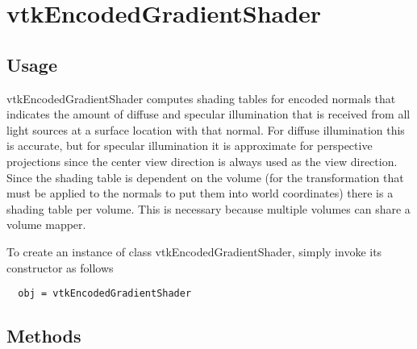 \section{vtkEncodedGradientShader}

\subsection{Usage}

 vtkEncodedGradientShader computes shading tables for encoded normals 
 that indicates the amount of diffuse and specular illumination that is 
 received from all light sources at a surface location with that normal.
 For diffuse illumination this is accurate, but for specular illumination
 it is approximate for perspective projections since the center view
 direction is always used as the view direction. Since the shading table is
 dependent on the volume (for the transformation that must be applied to
 the normals to put them into world coordinates) there is a shading table
 per volume. This is necessary because multiple volumes can share a 
 volume mapper.

To create an instance of class vtkEncodedGradientShader, simply
invoke its constructor as follows
\begin{verbatim}
  obj = vtkEncodedGradientShader
\end{verbatim}
\subsection{Methods}


